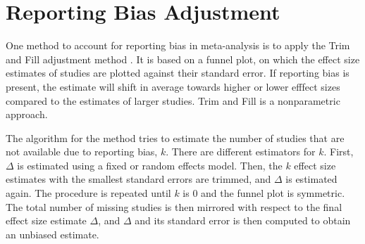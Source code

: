 \documentclass[11pt,a4paper,twoside]{book}\usepackage[]{graphicx}\usepackage[]{color}
\begin{document}
\section{Reporting Bias Adjustment}
One method to account for reporting bias in meta-analysis is to apply the Trim and Fill adjustment method \citep{trimfill}. It is based on a funnel plot, on which the effect size estimates of studies are plotted against their standard error. If reporting bias is present, the estimate will shift in average towards higher or lower efffect sizes compared to the estimates of larger studies. Trim and Fill is a nonparametric approach.

\vspace{0mm}
The algorithm for the method tries to estimate the number of studies that are not available due to reporting bias, $k$. There are different estimators for $k$. First, $\Delta$ is estimated using a fixed or random effects model. Then, the $k$ effect size estimates with the smallest standard errors are trimmed, and $\Delta$ is estimated again. The procedure is repeated until $k$ is 0 and the funnel plot is symmetric. The total number of missing studies is then mirrored with respect to the final effect size estimate $\Delta$, and $\Delta$ and its standard error is then computed to obtain an unbiased estimate.




% 
% 
% 
% 
% 
% 
\end{document}
